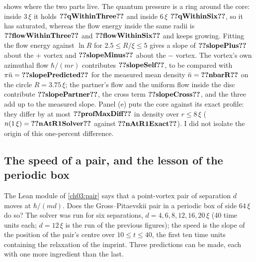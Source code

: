  shows where the two parts live. The quantum pressure is a ring around the core: inside $3\,\xi$ it holds $\cthreeNum{qWithinThree}$ and inside $6\,\xi$ $\cthreeNum{qWithinSix}$, so it has saturated, whereas the flow energy inside the same radii is $\cthreeNum{flowWithinThree}$ and $\cthreeNum{flowWithinSix}$ and keeps growing. Fitting the flow energy against $\ln R$ for $2.5\le R/\xi\le5$ gives a slope of $\cthreeNum{slopePlus}$ about the $+$ vortex and $\cthreeNum{slopeMinus}$ about the $-$ vortex. The vortex's own azimuthal flow $\hbar/(mr)$ contributes $\cthreeNum{slopeSelf}$, to be compared with $\pi\bar n=\cthreeNum{slopePredicted}$ for the measured mean density $\bar n=\cthreeNum{nbarR}$ on the circle $R=3.75\,\xi$; the partner's flow and the uniform flow inside the disc contribute $\cthreeNum{slopePartner}$, the cross term $\cthreeNum{slopeCross}$, and the three add up to the measured slope. Panel (e) puts the core against its exact profile: they differ by at most $\cthreeNum{profMaxDiff}$ in density over $r\le8\,\xi$ ($n(1\,\xi)=\cthreeNum{nAtR1Solver}$ against $\cthreeNum{nAtR1Exact}$). I did not isolate the origin of this one-percent difference.

\subsection{The speed of a pair, and the lesson of the periodic box}\label{ch03:speed}

The Lean module of \cref{ch03:pair} says that a point-vortex pair of separation $d$ moves at $\hbar/(md)$. Does the Gross--Pitaevskii pair in a periodic box of side $64\,\xi$ do so? The solver was run for six separations, $d=4,6,8,12,16,20\,\xi$ (40 time units each; $d=12\,\xi$ is the run of the previous figures); the speed is the slope of the position of the pair's centre over $10\le t\le40$, the first ten time units containing the relaxation of the imprint. Three predictions can be made, each with one more ingredient than the last.

